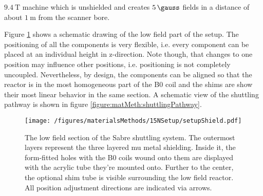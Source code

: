     $\SI{9.4}{\tesla}$ machine which is unshielded and creates $\SI{5}{\gauss}$ fields in a distance of about $\SI{1}{\meter}$ from the scanner bore.

    Figure \ref{figure:materialsMethods:shields15N} shows a schematic drawing of the low field part of the setup. The positioning of all the components is very flexible, i.e. every component can be placed at an individual height in z-direction. Note though, that changes to one position may influence other positions, i.e. positioning is not completely uncoupled. Nevertheless, by design, the components can be aligned so that the reactor is in the most homogeneous part of the B0 coil and the shims are show their most linear behavior in the same section. A schematic view of the shuttling pathway is shown in figure \ref{figure:matMeth:shuttlingPathway}.
        \begin{figure}
            \texttt{[image: /figures/materialsMethods/15NSetup/setupShield.pdf]}
            \caption[Shuttling system shields]{The low field section of the Sabre shuttling system. The outermost layers represent the three layered mu metal shielding. Inside it, the form-fitted holes with the B0 coils wound onto them are displayed with the acrylic tube they're mounted onto. Further to the center, the optional shim tube is visible surrounding the low field reactor. All position adjustment directions are indicated via arrows.}
            \label{figure:materialsMethods:shields15N}
        \end{figure}
